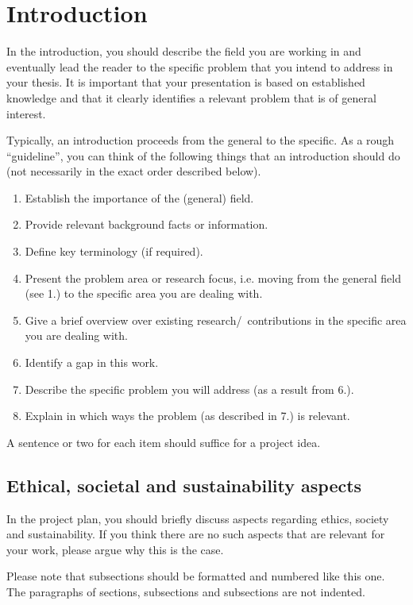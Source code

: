 \documentclass[12pt,a4paper,twoside]{article}
\begin{document}
\section{Introduction}
\label{sec:intro}
In the introduction, you should describe the field you are working in and eventually lead the reader to the specific problem that you intend to address in your thesis. It is important that your presentation is based on established knowledge and that it clearly identifies a relevant problem that is of general interest.

Typically, an introduction proceeds from the general to the specific. As a rough ``guideline'', you can think of the following things that an introduction should do (not necessarily in the exact order described below).
\begin{enumerate}
    \item Establish the importance of the (general) field.
    \item Provide relevant background facts or information.
    \item Define key terminology (if required).
    \item Present the problem area or research focus, i.e. moving from the general field (see 1.) to the specific area you are dealing with.
    \item Give a brief overview over existing research/~contributions in the specific area you are dealing with.
    \item Identify a gap in this work.
    \item Describe the specific problem you will address (as a result from 6.).
    \item Explain in which ways the problem (as described in 7.) is relevant.
\end{enumerate}
A sentence or two for each item should suffice for a project idea.


\subsection{Ethical, societal and sustainability aspects}
\label{sec:ethics}
In the project plan, you should briefly discuss aspects regarding ethics, society and sustainability. If you think there are no such aspects that are relevant for
your work, please argue why this is the case.

Please note that subsections should be formatted and numbered like this one.
The paragraphs of sections, subsections and subsections are not indented.
\end{document}
